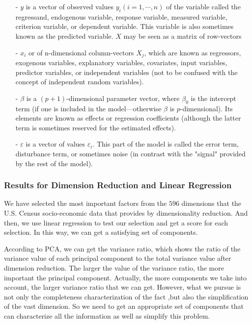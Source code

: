 \documentclass{mcmthesis}
\begin{document}
\begin{itemize}
\item[-] $y$ is a vector of observed values $y_{i} ( i = 1, \cdots, n )$ of the variable called the regressand, endogenous variable, response variable, measured variable, criterion variable, or dependent variable. This variable is also sometimes known as the predicted variable. $X$ may be seen as a matrix of row-vectors 
\item[-] $x_{i}$ or of n-dimensional column-vectors $X_{j}$, which are known as regressors, exogenous variables, explanatory variables, covariates, input variables, predictor variables, or independent variables (not to be confused with the concept of independent random variables).
 \item[-] $\beta$ is a $( p + 1 )$-dimensional parameter vector, where $\beta _{0}$ is the intercept term (if one is included in the model—otherwise $\beta$ is $p$-dimensional). Its elements are known as effects or regression coefficients (although the latter term is sometimes reserved for the estimated effects).
\item[-] $\varepsilon$ is a vector of values $\varepsilon _{i}$. This part of the model is called the error term, disturbance term, or sometimes noise (in contrast with the "signal" provided by the rest of the model).

\end{itemize}

\subsubsection{Results for Dimension Reduction and Linear Regression}\label{sec:DRLR}

We have selected the most important factors from the $596$ dimensions that the U.S. Census socio-economic data that provides by dimensionality reduction. And then, we use linear regression to test our selection and get a score for each selection. In this way, we can get a satisfying set of components. 

According to PCA, we can get the variance ratio, which shows the ratio of the variance value of each principal component to the total variance value after dimension reduction. The larger the value of the variance ratio, the more important the principal component. Actually, the more components we take into account, the larger variance ratio that we can get. However, what we pursue is not only the completeness characterization of the fact ,but also the simplification of the vast dimension. So we need to get an appropriate set of components that can characterize all the information as well as simplify this problem.
\end{document}
